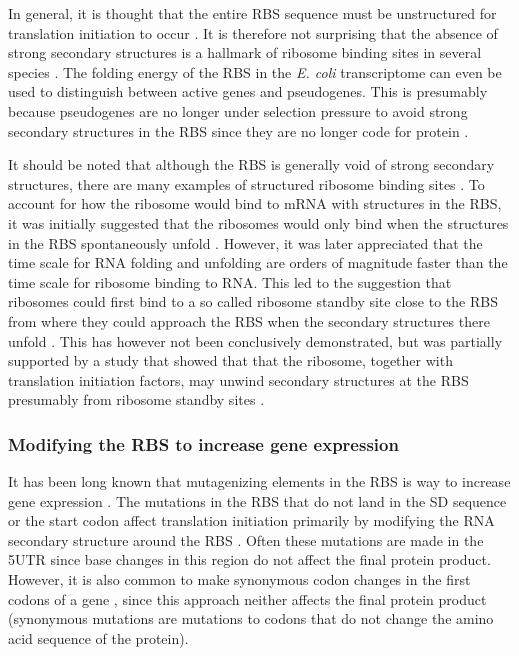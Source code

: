 In general, it is thought that the entire RBS sequence must be unstructured for
translation initiation to occur \cite{seo_quantitative_2009}. It is therefore
not surprising that the absence of strong secondary structures is a hallmark of
ribosome binding sites in several species \cite{gu_universal_2010}. The folding
energy of the RBS in the \textit{E. coli} transcriptome can even be used to
distinguish between active genes and pseudogenes. This is presumably because
pseudogenes are no longer under selection pressure to avoid strong secondary
structures in the RBS since they are no longer code for protein
\cite{keller_reduced_2012}.

It should be noted that although the RBS is generally void of strong secondary
structures, there are many examples of structured ribosome binding sites
\cite{studer_unfolding_2006}. To account for how the ribosome would bind to
mRNA with structures in the RBS, it was initially suggested that the ribosomes
would only bind when the structures in the RBS spontaneously unfold
\cite{de_smit_translational_1994}. However, it was later appreciated that the
time scale for RNA folding and unfolding are orders of magnitude faster than
the time scale for ribosome binding to RNA. This led to the suggestion that
ribosomes could first bind to a so called ribosome standby site close to the
RBS from where they could approach the RBS when the secondary structures there
unfold \cite{de_smit_translational_2003}. This has however not been
conclusively demonstrated, but was partially supported by a study that showed
that that the ribosome, together with translation initiation factors, may
unwind secondary structures at the RBS presumably from ribosome standby sites
\cite{studer_unfolding_2006}.

\subsubsection{Modifying the RBS to increase gene expression}
It has been long known that mutagenizing elements in the RBS is way to increase
gene expression \cite{warburton_increased_1983}. The mutations in the RBS that
do not land in the SD sequence or the start codon affect translation
initiation primarily by modifying the RNA secondary structure around the RBS
\cite{park_design_2007, care_translation_2007}. Often these mutations are made
in the 5\ppp UTR since base changes in this region do not affect the final
protein product. However, it is also common to make synonymous codon changes in
the first codons of a gene \cite{cebe_rapid_2006}, since this approach neither
affects the final protein product (synonymous mutations are mutations to codons
that do not change the amino acid sequence of the protein).

